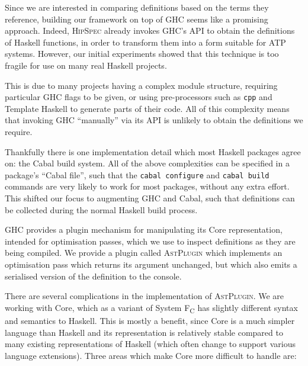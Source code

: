 \documentclass[]{article}
\begin{document}
Since we are interested in comparing definitions based on the terms they reference, building our framework on top of GHC seems like a promising approach. Indeed, \textsc{HipSpec} already invokes GHC's API to obtain the definitions of Haskell functions, in order to transform them into a form suitable for ATP systems. However, our initial experiments showed that this technique is too fragile for use on many real Haskell projects.

This is due to many projects having a complex module structure, requiring particular GHC flags to be given, or using pre-processors such as \texttt{cpp} and Template Haskell to generate parts of their code. All of this complexity means that invoking GHC ``manually'' via its API is unlikely to obtain the definitions we require.

Thankfully there is one implementation detail which most Haskell packages agree on: the Cabal build system. All of the above complexities can be specified in a package's ``Cabal file'', such that the \texttt{cabal configure} and \texttt{cabal build} commands are very likely to work for most packages, without any extra effort. This shifted our focus to augmenting GHC and Cabal, such that definitions can be collected during the normal Haskell build process.

GHC provides a plugin mechanism for manipulating its Core representation, intended for optimisation passes, which we use to inspect definitions as they are being compiled. We provide a plugin called \textsc{AstPlugin} which implements an optimisation pass which returns its argument unchanged, but which also emits a serialised version of the definition to the console.

There are several complications in the implementation of \textsc{AstPlugin}. We are working with Core, which as a variant of System F\textsubscript{C} \cite{sulzmann2007system} has slightly different syntax and semantics to Haskell. This is mostly a benefit, since Core is a much simpler language than Haskell and its representation is relatively stable compared to many existing representations of Haskell (which often change to support various language extensions). Three areas which make Core more difficult to handle are:
\end{document}
